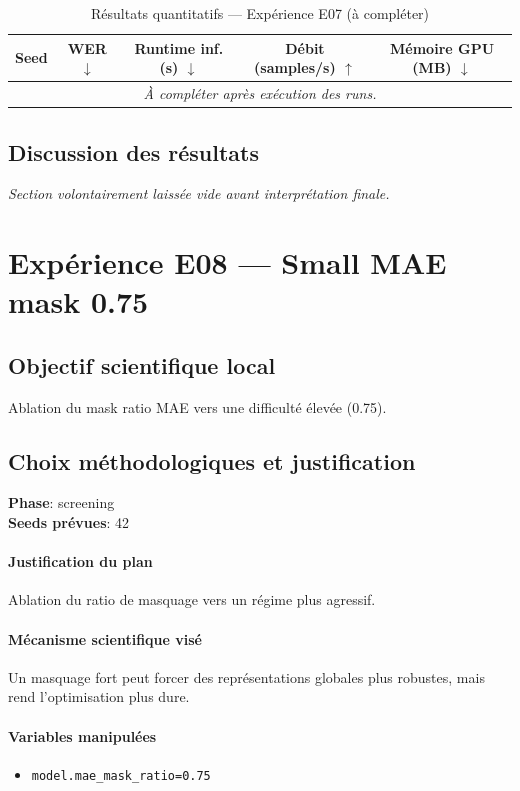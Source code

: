 \documentclass[11pt,a4paper]{article}
\begin{document}
\begin{table}[H]
\centering
\caption{Résultats quantitatifs --- Expérience E07 (à compléter)}
\begin{tabular}{lcccc}
\toprule
Seed & WER $\downarrow$ & Runtime inf. (s) $\downarrow$ & Débit (samples/s) $\uparrow$ & Mémoire GPU (MB) $\downarrow$ \\
\midrule
\multicolumn{5}{c}{\textit{À compléter après exécution des runs.}} \\
\bottomrule
\end{tabular}
\end{table}

\subsection{Discussion des résultats}
\textit{Section volontairement laissée vide avant interprétation finale.}


\section{Expérience E08 --- Small MAE mask 0.75}
\subsection{Objectif scientifique local}
Ablation du mask ratio MAE vers une difficulté élevée (0.75).

\subsection{Choix méthodologiques et justification}
\textbf{Phase}: screening\\
\textbf{Seeds prévues}: 42\\


\paragraph{Justification du plan}
Ablation du ratio de masquage vers un régime plus agressif.

\paragraph{Mécanisme scientifique visé}
Un masquage fort peut forcer des représentations globales plus robustes, mais rend l'optimisation plus dure.

\paragraph{Variables manipulées}
\begin{itemize}
\item \texttt{model.mae\_mask\_ratio=0.75}
\end{itemize}
\end{document}
